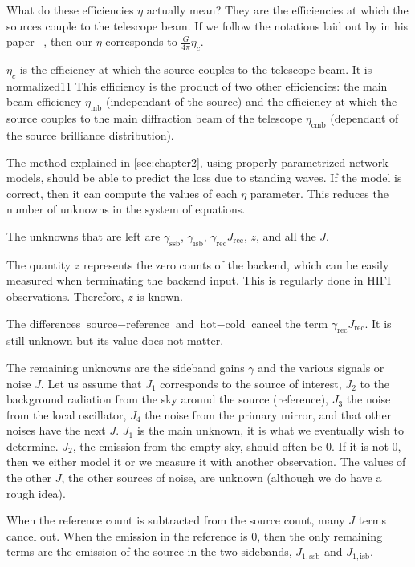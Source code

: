 What do these efficiencies $\eta$ actually mean?
They are the efficiencies at which the sources couple to the telescope beam.
If we follow the notations laid out by \citeauthor{mangum2006tempscales} in his paper ~\cite{mangum2006tempscales},
then our $\eta$ corresponds to $\frac{G}{4\pi}\eta_c$.

$\eta_c$ is the efficiency at which the source couples to the telescope beam.
It is normalized11
This efficiency is the product of two other efficiencies: the main beam efficiency $\eta_\text{mb}$ (independant of the source) and the efficiency at which the source couples to the main diffraction beam of the telescope $\eta_\text{cmb}$ (dependant of the source brilliance distribution).




The method explained in \cref{sec:chapter2}, using properly parametrized network models, should be able to predict the loss due to standing waves.
If the model is correct, then it can compute the values of each $\eta$ parameter.
This reduces the number of unknowns in the system of equations.

The unknowns that are left are $\gamma_\text{ssb}$, $\gamma_\text{isb}$,
$\gamma_\text{rec} J_\text{rec}$, $z$, and all the $J$.

The quantity $z$ represents the zero counts of the backend, which can be easily measured when terminating the backend input.
This is regularly done in HIFI observations.
Therefore, $z$ is known.

The differences $\text{source} - \text{reference}$ and $\text{hot} - \text{cold}$ cancel the term $\gamma_\text{rec} J_\text{rec}$.
It is still unknown but its value does not matter.

The remaining unknowns are the sideband gains $\gamma$ and the various signals or noise $J$.
Let us assume that $J_1$ corresponds to the source of interest, $J_2$ to the background radiation from the sky around the source (reference), $J_3$ the noise from the local oscillator, $J_4$ the noise from the primary mirror, and that other noises have the next $J$.
$J_1$ is the main unknown, it is what we eventually wish to determine.
$J_2$, the emission from the empty sky, should often be 0.  If it is not 0, then we either model it or we measure it with another observation.
The values of the other $J$, the other sources of noise, are unknown (although we do have a rough idea).

When the reference count is subtracted from the source count, many $J$ terms cancel out.
When the emission in the reference is 0, then the only remaining terms are the emission of the source in the two sidebands, $J_{1,\text{ssb}}$ and $J_{1,\text{isb}}$.



